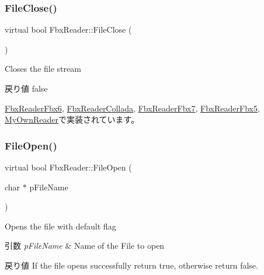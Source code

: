 \mbox{\label{class_fbx_reader_a327df94e5c24315fc5cbcedf0e7bb615}} 
\subsubsection{\texorpdfstring{File\+Close()}{FileClose()}}
{\footnotesize\ttfamily virtual bool Fbx\+Reader\+::\+File\+Close (\begin{DoxyParamCaption}{ }\end{DoxyParamCaption})\hspace{0.3cm}{\ttfamily [pure virtual]}}

Closes the file stream \begin{DoxyReturn}{戻り値}
{\ttfamily false} 
\end{DoxyReturn}


\hyperlink{class_fbx_reader_fbx6_a05230d40a8c8c2f62afee63f70a8d3be}{Fbx\+Reader\+Fbx6}, \hyperlink{class_fbx_reader_collada_a5668036ed12534fd339f3106c0d09864}{Fbx\+Reader\+Collada}, \hyperlink{class_fbx_reader_fbx7_a06f5323e8d483a1103d54fc53cceadc9}{Fbx\+Reader\+Fbx7}, \hyperlink{class_fbx_reader_fbx5_a315730ff4083066964d32c6d3b3a717d}{Fbx\+Reader\+Fbx5}, \hyperlink{class_my_own_reader_abc7f3b49b51e2e59e502e774c78443d8}{My\+Own\+Reader}で実装されています。

\mbox{\label{class_fbx_reader_a6105bd37ae86c03f35aee6f62901856d}} 
\subsubsection{\texorpdfstring{File\+Open()}{FileOpen()}\hspace{0.1cm}{\footnotesize\ttfamily [1/4]}}
{\footnotesize\ttfamily virtual bool Fbx\+Reader\+::\+File\+Open (\begin{DoxyParamCaption}\item[{char $\ast$}]{p\+File\+Name }\end{DoxyParamCaption})\hspace{0.3cm}{\ttfamily [pure virtual]}}

Opens the file with default flag 
\begin{DoxyParams}{引数}
{\em p\+File\+Name} & Name of the File to open \\
\hline
\end{DoxyParams}
\begin{DoxyReturn}{戻り値}
If the file opens successfully return {\ttfamily true}, otherwise return {\ttfamily false}. 
\end{DoxyReturn}


